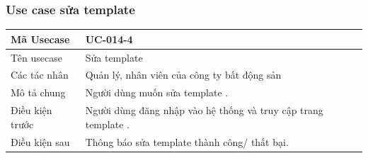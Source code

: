 \documentclass[12pt,a4paper]{article}
\begin{document}
    \subsubsection*{Use case sửa template  }
    \begin{table}[H]
        \centering
        \begin{tabular}{|p{3.5cm}|p{11.5cm}|c|}
            \hline
            Mã Usecase      & UC-014-4                                                       \\
            \hline
            Tên usecase     & Sửa template                                                   \\
            \hline
            Các tác nhân    & Quản lý, nhân viên của công ty bất động sản                    \\
            \hline
            Mô tả chung     & Người dùng muốn sửa template .                                 \\
            \hline

            Điều kiện trước & Người dùng đăng nhập vào hệ thống và truy cập trang template . \\
            \hline

            Điều kiện sau   & Thông báo sửa template thành công/ thất bại.                   \\
            \hline


\end{tabular}
\end{table}
\end{document}
